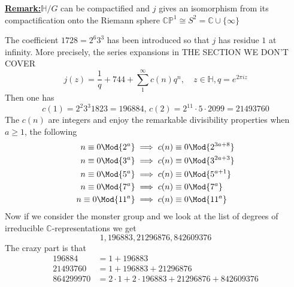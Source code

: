 \documentclass[12pt]{article}
\theoremstyle{definition}
\newenvironment{remark}[1]{\par\noindent\underline{\textbf{Remark:}}\space#1}{}
\begin{document}
\begin{remark}
    \(\mathbb{H}/G\) can be compactified and \(j\) gives an isomorphism from its compactification onto the Riemann sphere \( \mathbb{C} \mathbb{P} ^1 \cong S^2 = \mathbb{C} \cup \{ \infty  \}  \) 
\end{remark}

The coefficient \(1728 = 2^6 3^3\) has been introduced so that \(j\) has residue \(1\) at infinity. More precisely, the series expansions in THE SECTION WE DON'T COVER
\[
    j(z) =\frac{1}{q} + 744 + \sum_{1}^{\infty} c(n)q^n, \quad z\in \mathbb{H}, q = e^{2\pi iz}
\] 
Then one has
\[
    c(1) = 2^2 3^3 1823 = 196884, \, c(2) = 2^{11} \cdot 5 \cdot 2099 = 21493760 
\]
The \(c(n)\) are integers and enjoy the remarkable divisibility properties when \(a\geq 1\), the following 
\begin{align*}
n \equiv 0\Mod{2^a} &\implies c(n) \equiv 0 \Mod{2^{3a+8}}\\
n \equiv 0\Mod{3^a} &\implies c(n) \equiv 0 \Mod{3^{2a+3}}\\
n \equiv 0\Mod{5^a} &\implies c(n) \equiv 0 \Mod{5^{a+1}}\\
n \equiv 0\Mod{7^a} &\implies c(n) \equiv 0 \Mod{7^a}\\
n \equiv 0\Mod{11^a} &\implies c(n) \equiv 0 \Mod{11^a}
\end{align*}
Now if we consider the monster group and we look at the list of degrees of irreducible \(\mathbb{C} \)-representations we get
\[
    1,196883,21296876,842609376
\] 
The crazy part is that 
\begin{align*}
196884 &= 1+ 196883\\
21493760&= 1 +196883+21296876\\
864299970&=2 \cdot 1+2 \cdot 196883 + 21296876 +842609376
\end{align*}
\end{document}

